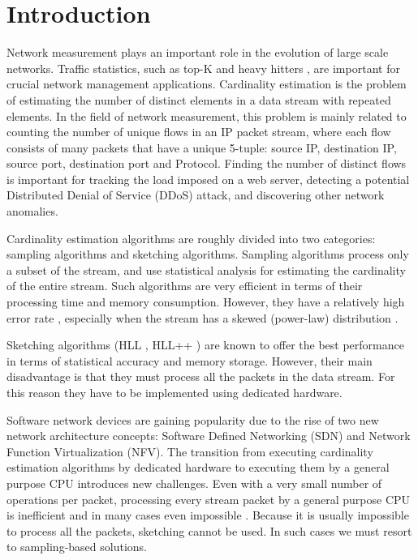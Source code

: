 
\section{Introduction} \label{sec:intro}

	Network measurement plays an important role in the evolution of large scale networks. Traffic statistics, such as top-K \cite{mouratidis2006continuous} and heavy hitters \cite{ben2016heavy}, are important for crucial network management applications. Cardinality estimation is the problem of estimating the number of distinct elements in a data stream with repeated elements. In the field of network measurement, this problem is mainly related to counting the number of unique flows in an IP packet stream, where each flow consists of many packets that have a unique 5-tuple: source IP, destination IP, source port, destination port and Protocol. Finding the number of distinct flows is important for tracking the load imposed on a web server, detecting a potential Distributed Denial of Service (DDoS) attack, and discovering other network anomalies.
	
	Cardinality estimation algorithms are roughly divided into two categories: sampling algorithms and sketching algorithms. Sampling algorithms process only a subset of the stream, and use statistical analysis for estimating the cardinality of the entire stream. Such algorithms are very efficient in terms of their processing time and memory consumption. However, they have a relatively high error rate \cite{charikar2000towards}, especially when the stream has a skewed (power-law) distribution \cite{deolalikar2016extensive}.
	
	Sketching algorithms (HLL \cite{flajolet2007hyperloglog}, HLL++ \cite{heule2013hyperloglog}) are known to offer the best performance in terms of statistical accuracy and memory storage. However, their main disadvantage is that they must process all the packets in the data stream. For this reason they have to be implemented using dedicated hardware\cite{Liu:2016}.
	
	Software network devices are gaining popularity due to the rise of two new network architecture concepts: Software Defined Networking (SDN)  and Network Function Virtualization (NFV). The transition from executing cardinality estimation algorithms by dedicated hardware to executing them by a general purpose CPU introduces new challenges. Even with a very small number of operations per packet, processing every stream packet by a general purpose CPU is inefficient and in many cases even impossible \cite{alipourfard2015re,alipourfard2018comparison}. Because it is usually impossible to process all the packets, sketching cannot be used. In such cases we must resort to sampling-based solutions.
	
